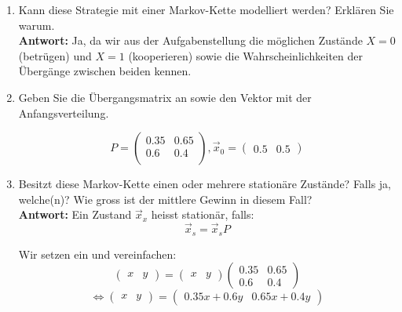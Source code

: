 \documentclass[12pt,a4paper]{article}
\begin{document}
\begin{enumerate}
\begin{enumerate}
\item Kann diese Strategie mit einer Markov-Kette modelliert werden? Erklären Sie warum.\\
\textbf{Antwort:} Ja, da wir aus der Aufgabenstellung die möglichen Zustände $X=0$ (betrügen) und $X=1$ (kooperieren) sowie die Wahrscheinlichkeiten der Übergänge zwischen beiden kennen.
\begin{center}
\end{center}

\item Geben Sie die Übergangsmatrix an sowie den Vektor mit der Anfangsverteilung.
\begin{center}
$$P = \begin{pmatrix}
 0.35 & 0.65\\
 0.6  & 0.4\\
\end{pmatrix},
\vec x_0 = \begin{pmatrix}
 0.5 & 0.5
\end{pmatrix}$$
\end{center}
\newpage

\item Besitzt diese Markov-Kette einen oder mehrere stationäre Zustände?
Falls ja, welche(n)?
Wie gross ist der mittlere Gewinn in diesem Fall?\\
\textbf{Antwort:} Ein Zustand $\vec x_x$ heisst stationär, falls:\\
$$\vec x_s =\vec x_s P$$

Wir setzen ein und vereinfachen:
$$\begin{pmatrix}
 x & y
\end{pmatrix} = \begin{pmatrix}
 x & y
\end{pmatrix} \begin{pmatrix}
 0.35 & 0.65\\
 0.6  & 0.4
\end{pmatrix}$$
$$\Leftrightarrow \begin{pmatrix}
 x & y
\end{pmatrix} = \begin{pmatrix}
 0.35x + 0.6y & 0.65x + 0.4y
\end{pmatrix}$$


\end{enumerate}
\end{enumerate}
\end{document}
